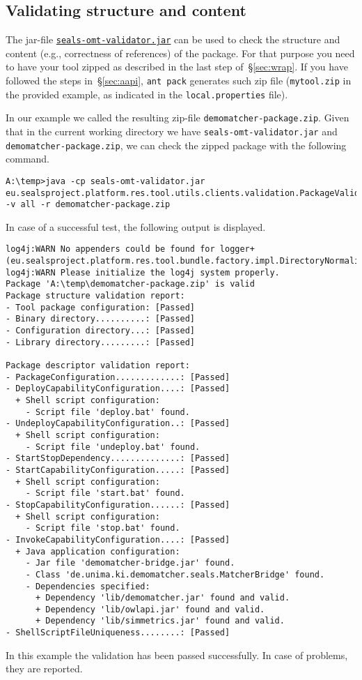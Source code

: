 \documentclass{article}
\def\file#1{\textcolor{grayy}{\texttt{#1}}}
\begin{document}
\subsection{Validating structure and content}
\label{sub:test-structure}

The jar-file \href{http://oaei.ontologymatching.org/2011/tutorial/seals-omt-validator.jar}{\nolinkurl{seals-omt-validator.jar}} can be used to check the structure and content (e.g., correctness of references) of the package. For that purpose you need to have your tool zipped as described in the last step of~\S\ref{sec:wrap}. If you have followed the steps in~\S\ref{sec:aapi}, \verb|ant pack| generates such zip file (\file{mytool.zip} in the provided example, as indicated in the \file{local.properties} file). 

In our example we called the resulting zip-file \file{demomatcher-package.zip}. Given that in the current working directory we have \file{seals-omt-validator.jar} and \file{demomatcher-package.zip}, we can check the zipped package with the following command.

\small
\begin{verbatim}
A:\temp>java -cp seals-omt-validator.jar
eu.sealsproject.platform.res.tool.utils.clients.validation.PackageValidator
-v all -r demomatcher-package.zip
\end{verbatim}
\normalsize
In case of a successful test, the following output is displayed.
\small
\begin{verbatim}
log4j:WARN No appenders could be found for logger+
(eu.sealsproject.platform.res.tool.bundle.factory.impl.DirectoryNormalizer).
log4j:WARN Please initialize the log4j system properly.
Package 'A:\temp\demomatcher-package.zip' is valid
Package structure validation report:
- Tool package configuration: [Passed]
- Binary directory..........: [Passed]
- Configuration directory...: [Passed]
- Library directory.........: [Passed]

Package descriptor validation report:
- PackageConfiguration.............: [Passed]
- DeployCapabilityConfiguration....: [Passed]
  + Shell script configuration:
    - Script file 'deploy.bat' found.
- UndeployCapabilityConfiguration..: [Passed]
  + Shell script configuration:
    - Script file 'undeploy.bat' found.
- StartStopDependency..............: [Passed]
- StartCapabilityConfiguration.....: [Passed]
  + Shell script configuration:
    - Script file 'start.bat' found.
- StopCapabilityConfiguration......: [Passed]
  + Shell script configuration:
    - Script file 'stop.bat' found.
- InvokeCapabilityConfiguration....: [Passed]
  + Java application configuration:
    - Jar file 'demomatcher-bridge.jar' found.
    - Class 'de.unima.ki.demomatcher.seals.MatcherBridge' found.
    - Dependencies specified:
      + Dependency 'lib/demomatcher.jar' found and valid.
      + Dependency 'lib/owlapi.jar' found and valid.
      + Dependency 'lib/simmetrics.jar' found and valid.
- ShellScriptFileUniqueness........: [Passed]
\end{verbatim}
\normalsize
In this example the validation has been passed successfully. In case of problems, they are reported.
\end{document}

